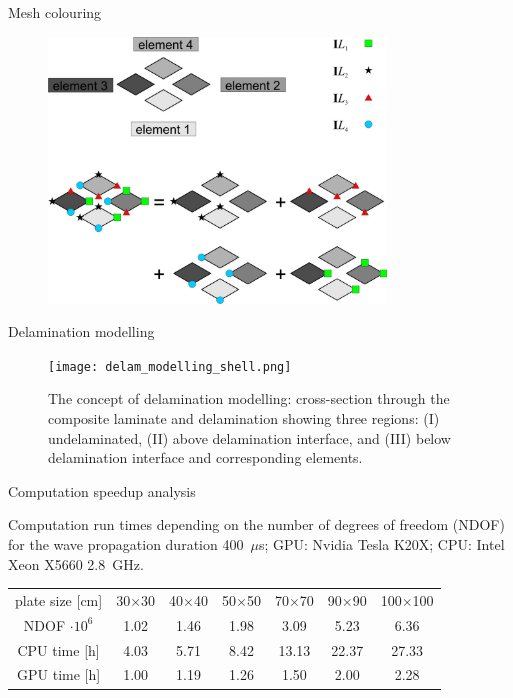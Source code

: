 \documentclass[10pt]{beamer} %
\begin{document}
\begin{frame}{Mesh colouring}
	\begin{figure}
		\centering
			\includegraphics[width=0.8\textwidth]{beamer_figs/mesh_colouring_scheme4.jpg}	
			\label{fig:mesh_colouring}
	\end{figure}
\end{frame}
\begin{frame}[t]{Delamination modelling}
	\begin{figure} [h!]
		\centering
		\texttt{[image: delam\_modelling\_shell.png]}	
		\caption{The concept of delamination modelling: cross-section through the composite laminate and delamination showing three regions: (I) undelaminated, (II) above delamination interface, and (III) below delamination interface and corresponding elements.}
		\label{fig:delam_modelling_shell}
	\end{figure}
\end{frame}
\begin{frame}{Computation speedup analysis}
	\begin{table}
		\renewcommand{\arraystretch}{1.3}
		\centering \small
		Computation run times depending on the number of degrees of freedom (NDOF) for the wave propagation duration 400~$\mu$s; GPU: Nvidia Tesla K20X; CPU: Intel Xeon X5660 2.8~GHz.
		
		\begin{tabular}{ccccccc} 
			\toprule	
			plate size [cm] & 30$\times$30  & 40$\times$40 & 50$\times$50 & 70$\times$70 & 90$\times$90 & 100$\times$100 \\
			NDOF $\cdot 10^6$ & 1.02  & 1.46 & 1.98 & 3.09 & 5.23 & 6.36 \\
			\midrule
			CPU time [h]& 4.03& 5.71 & 8.42 & 13.13 & 22.37 & 27.33\\
			\midrule
			GPU time [h]& 1.00& 1.19 & 1.26 & 1.50 & 2.00 & 2.28\\
			\bottomrule 
		\end{tabular} 
		\label{tab:run_time}
	\end{table}
\end{frame}
\end{document}
